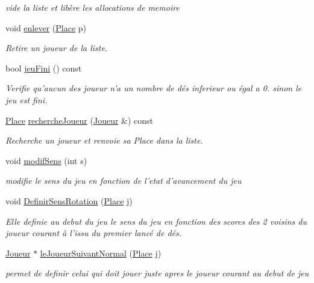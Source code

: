 \begin{DoxyCompactItemize}
\begin{DoxyCompactList}\small\item\em vide la liste et libère les allocations de memoire \end{DoxyCompactList}\item 
void \hyperlink{class_liste_a3532441b8f44bf32478e5e10e51c16e8}{enlever} (\hyperlink{class_cell}{\-Place} p)
\begin{DoxyCompactList}\small\item\em \-Retire un joueur de la liste. \end{DoxyCompactList}\item 
bool \hyperlink{class_liste_ab620772bc75880cdd8f514a890db7420}{jeu\-Fini} () const 
\begin{DoxyCompactList}\small\item\em \-Verifie qu'aucun des joueur n'a un nombre de dés inferieur ou égal a 0. sinon le jeu est fini. \end{DoxyCompactList}\item 
\hyperlink{class_cell}{\-Place} \hyperlink{class_liste_af387ebfb4a9c626237a92467b99c8336}{recherche\-Joueur} (\hyperlink{class_joueur}{\-Joueur} \&) const 
\begin{DoxyCompactList}\small\item\em \-Recherche un joueur et renvoie sa \-Place dans la liste. \end{DoxyCompactList}\item 
void \hyperlink{class_liste_af8c1f90e98973bad385457d869c6d14c}{modif\-Sens} (int s)
\begin{DoxyCompactList}\small\item\em modifie le sens du jeu en fonction de l'etat d'avancement du jeu \end{DoxyCompactList}\item 
void \hyperlink{class_liste_a404e1cae936b110849a6a439b65f048f}{\-Definir\-Sens\-Rotation} (\hyperlink{class_cell}{\-Place} j)
\begin{DoxyCompactList}\small\item\em \-Elle definie au debut du jeu le sens du jeu en fonction des scores des 2 voisins du joueur courant à l'issu du premier lancé de dés. \end{DoxyCompactList}\item 
\hyperlink{class_joueur}{\-Joueur} $\ast$ \hyperlink{class_liste_a712a92fe898df9af9eadd54f57c69b9e}{le\-Joueur\-Suivant\-Normal} (\hyperlink{class_cell}{\-Place} j)
\begin{DoxyCompactList}\small\item\em permet de definir celui qui doit jouer juste apres le joueur courant au debut de jeu \end{DoxyCompactList}\item 

\end{DoxyCompactItemize}
